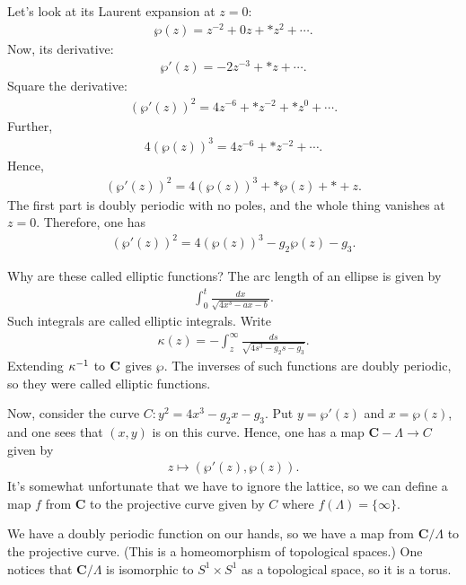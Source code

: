 \documentclass [11 pt, oneside, margin = 1 in] {article}
\begin{document}
Let's look at its Laurent expansion at $z=0$:
\begin{align*}
	\wp(z) = z^{-2} + 0 z + *z^2 + \cdots.
\end{align*}
Now, its derivative:
\begin{align*}
	\wp'(z) = -2z^{-3} + *z +\cdots.
\end{align*}
Square the derivative:
\begin{align*}
	(\wp'(z)) ^2 = 4z^{-6} + *z^{-2} + *z^0 + \cdots.
\end{align*}
Further,
\begin{align*}
	4(\wp(z)) ^3 = 4z^{-6} + *z^{-2} + \cdots.
\end{align*}
Hence,
\begin{align*}
	(\wp'(z)) ^2 = 4(\wp(z)) ^3 +  *\wp(z) + * + z.
\end{align*}
The first part is doubly periodic with no poles, and the whole thing vanishes at $z=0$. Therefore, one has
\begin{align*}
	(\wp'(z)) ^2 = 4(\wp(z)) ^3 - g_2 \wp(z) -  g_3.
\end{align*}

Why are these called elliptic functions? The arc length of an ellipse is given by 
\begin{align*}
	\int_{0}^{t} \frac{dx}{\sqrt{4x^3 - ax - b} }. 
\end{align*}
Such integrals are called elliptic integrals. Write
\begin{align*}
	\kappa(z) = -\int_{z}^{\infty} \frac{ds}{\sqrt{4s^3 -g_2s - g_3} }. 
\end{align*}
Extending $\kappa^{-1}$ to $\mathbf C$ gives $\wp$. The inverses of such functions are doubly periodic, so they were called elliptic functions.

Now, consider the curve $C:y^2 = 4x^3 - g_2x-g_3$. Put $y=\wp'(z)$ and $x=\wp(z)$, and one sees that $(x,y)$ is on this curve. Hence, one has a map $\mathbf{C}-\Lambda \longrightarrow C$ given by
\begin{align*}
	z\longmapsto (\wp'(z),\wp (z)).
\end{align*}
It's somewhat unfortunate that we have to ignore the lattice, so we can define a map $f$ from $\mathbf{C}$ to the projective curve given by $C$ where $f(\Lambda) = \{\infty\}$. 

We have a doubly periodic function on our hands, so we have a map from $\mathbf{C}/\Lambda$ to the projective curve. (This is a homeomorphism of topological spaces.) One notices that $\mathbf{C}/\Lambda$ is isomorphic to $S^1\times S^1$ as a topological space, so it is a torus.
\end{document}
